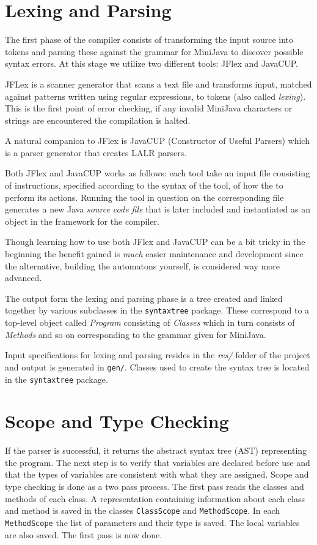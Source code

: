 \documentclass[11pt]{amsart}
\begin{document}
\section{Lexing and Parsing}
The first phase of the compiler consists of transforming the input source into tokens and parsing these against the grammar for MiniJava to discover possible syntax errors. At this stage we utilize two different tools: JFlex and JavaCUP. 

JFLex is a scanner generator that scans a text file and transforms input, matched against patterns written using regular expressions, to tokens (also called \textit{lexing}). This is the first point of error checking, if any invalid MiniJava characters or strings are encountered the compilation is halted.

A natural companion to JFlex is JavaCUP (Constructor of Useful Parsers) which is a parser generator that creates LALR parsers\cite{appel}.

Both JFlex and JavaCUP works as follows: each tool take an input file consisting of instructions, specified according to the syntax of the tool, of how the to perform its actions. Running the tool in question on the corresponding file generates a new Java \textit{source code file} that is later included and instantiated as an object in the framework for the compiler. 

Though learning how to use both JFlex and JavaCUP can be a bit tricky in the beginning the benefit gained is \textit{much} easier maintenance and development since the alternative, building the automatons\cite{automata} yourself, is considered way more advanced.

The output form the lexing and parsing phase is a tree created and linked together by various subclasses in the \texttt{syntaxtree} package. These correspond to a top-level object called \textit{Program} consisting of \textit{Classes} which in turn consists of \textit{Methods} and so on corresponding to the grammar given for MiniJava\cite{grammar}.

Input specifications for lexing and parsing resides in the \textit{res/} folder of the project and output is generated in \texttt{gen/}. Classes used to create the syntax tree is located in the \texttt{syntaxtree} package.

\section{Scope and Type Checking}
	If the parser is successful, it returns the abstract syntax tree (AST) representing the program. The next step is to verify that variables are declared before use and that the types of variables are consistent with what they are assigned. Scope and type checking is done as a two pass process. The first pass reads the classes and methods of each class. A representation containing information about each class and method is saved in the classes \texttt{ClassScope} and \texttt{MethodScope}. In each \texttt{MethodScope} the list of parameters and their type is saved. The local variables are also saved. The first pass is now done.
\end{document}
